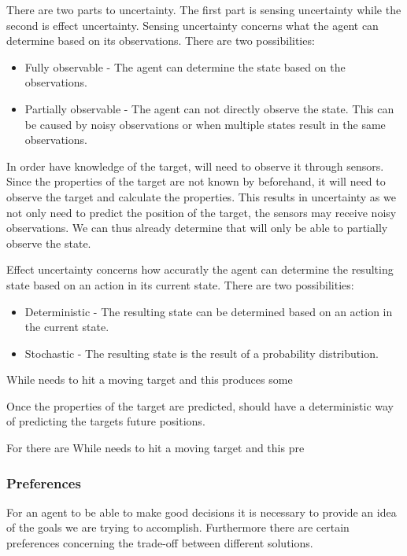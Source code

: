 There are two parts to uncertainty. The first part is sensing uncertainty while
the second is effect uncertainty. Sensing uncertainty concerns what the agent
can determine based on its observations. There are two possibilities:
\begin{itemize}
  \item Fully observable - The agent can determine the state based on
  the observations.
  \item Partially observable - The agent can not directly observe the state.
  This can be caused by noisy observations or when multiple states result in the
  same observations.
\end{itemize}
In order have knowledge of the target, \name will need to observe it through
sensors. Since the properties of the target are not known by \name beforehand,
it will need to observe the target and calculate the properties. This results
in uncertainty as we not only need to predict the position of the target, the
sensors may receive noisy observations. We can thus already determine that \name
will only be able to partially observe the state.\nl

Effect uncertainty concerns how accuratly the agent can determine the resulting
state based on an action in its current state. There are two possibilities:
\begin{itemize}
  \item Deterministic - The resulting state can be determined based on an action
  in the current state.
  \item Stochastic - The resulting state is the result of a probability
  distribution.
\end{itemize}

While \name needs to hit a moving target and this produces some



Once the properties of the target are predicted, \name should have a
deterministic way of predicting the targets future positions.

For \name there are
While \name needs to hit a moving target and this pre 
 
\subsubsection{Preferences}
For an agent to be able to make good decisions it is necessary to provide an
idea of the goals we are trying to accomplish. Furthermore there are certain
preferences concerning the trade-off between different solutions.

